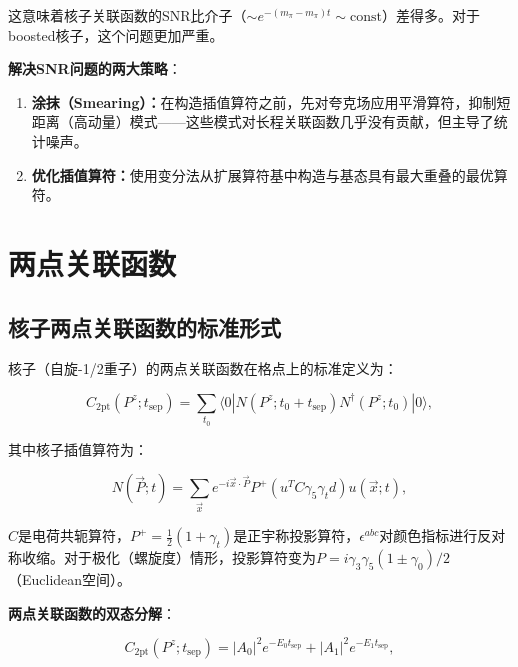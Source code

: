 \documentclass[12pt,a4paper]{ctexart}
\theoremstyle{definition}
\begin{document}
这意味着核子关联函数的SNR比介子（$\sim e^{-(m_\pi - m_\pi)t} \sim \text{const}$）差得多。对于boosted核子，这个问题更加严重。

\textbf{解决SNR问题的两大策略}\cite{Peardon2009,Egerer2021a,UKQCD1993}：
\begin{enumerate}
    \item \textbf{涂抹（Smearing）：}在构造插值算符之前，先对夸克场应用平滑算符，抑制短距离（高动量）模式——这些模式对长程关联函数几乎没有贡献，但主导了统计噪声。
    \item \textbf{优化插值算符：}使用变分法从扩展算符基中构造与基态具有最大重叠的最优算符。
\end{enumerate}

\section{两点关联函数}

\subsection{核子两点关联函数的标准形式}

核子（自旋-1/2重子）的两点关联函数在格点上的标准定义为\cite{Chen2025gluon}：

\begin{equation}
\boxed{C_{\text{2pt}}(P^z; t_{\text{sep}}) = \sum_{t_0} \langle 0| N(P^z; t_0 + t_{\text{sep}}) N^\dagger(P^z; t_0) |0\rangle},
\label{eq:2pt_nucleon}
\end{equation}

其中核子插值算符为\cite{Chen2025gluon,Zhang2025kinematic}：

\begin{equation}
N(\vec{P}; t) = \sum_{\vec{x}} e^{-i\vec{x}\cdot\vec{P}} P^+ (u^T C\gamma_5\gamma_t d) u(\vec{x}; t),
\label{eq:nucleon_interpolator}
\end{equation}

$C$是电荷共轭算符，$P^+ = \frac{1}{2}(1+\gamma_t)$是正宇称投影算符，$\epsilon^{abc}$对颜色指标进行反对称收缩。对于极化（螺旋度）情形，投影算符变为$P = i\gamma_3\gamma_5(1 \pm \gamma_0)/2$（Euclidean空间）\cite{NoteGluonPDFs}。

\textbf{两点关联函数的双态分解}\cite{Chen2025gluon}：

\begin{equation}
C_{\text{2pt}}(P^z; t_{\text{sep}}) = |A_0|^2 e^{-E_0 t_{\text{sep}}} + |A_1|^2 e^{-E_1 t_{\text{sep}}},
\label{eq:2pt_two_state}
\end{equation}
\end{document}
